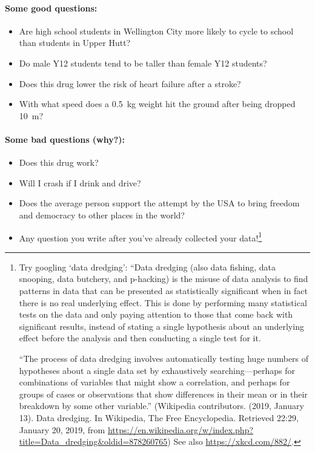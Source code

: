 \paragraph{Some good questions:}

\begin{itemize}
  \item Are high school students in Wellington City more likely to cycle to school than students in Upper Hutt?
  \item Do male Y12 students tend to be taller than female Y12 students?
  \item Does this drug lower the risk of heart failure after a stroke?
  \item With what speed does a \SI{0.5}{\kilo\gram} weight hit the ground after being dropped \SI{10}{\metre}?
\end{itemize}

\paragraph{Some bad questions (why?):}

\begin{itemize}
  \item Does this drug work?
  \item Will I crash if I drink and drive?
  \item Does the average person support the attempt by the USA to bring freedom and democracy to other places in the world?
  \item Any question you write after you've already collected your data!\footnote{Try googling `data dredging': ``Data dredging (also data fishing, data snooping,
        data butchery, and p-hacking) is the misuse of data analysis to find patterns in data that can be presented as statistically significant when in fact there
        is no real underlying effect. This is done by performing many statistical tests on the data and only paying attention to those that come back with
        significant results, instead of stating a single hypothesis about an underlying effect before the analysis and then conducting a single test for it.

        ``The process of data dredging involves automatically testing huge numbers of hypotheses about a single data set by exhaustively searching—perhaps for
        combinations of variables that might show a correlation, and perhaps for groups of cases or observations that show differences in their mean or in
        their breakdown by some other variable.'' (Wikipedia contributors. (2019, January 13). Data dredging. In Wikipedia, The Free Encyclopedia. Retrieved 22:29, January 20, 2019, from \url{https://en.wikipedia.org/w/index.php?title=Data_dredging&oldid=878260765}) See also \url{https://xkcd.com/882/}.}
\end{itemize}

